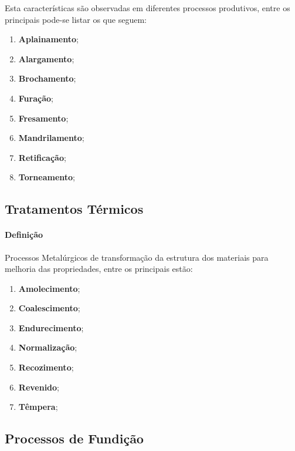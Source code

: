 \documentclass{article}
\begin{document}
            Esta características são observadas em diferentes processos produtivos, entre os principais pode-se listar os que seguem:
                \begin{enumerate}[rightmargin = \leftmargin, noitemsep]
                    \item \textbf{Aplainamento}; 
                    \item \textbf{Alargamento}; 
                    \item \textbf{Brochamento}; 
                    \item \textbf{Furação}; 
                    \item \textbf{Fresamento}; 
                    \item \textbf{Mandrilamento}; 
                    \item \textbf{Retificação}; 
                    \item \textbf{Torneamento}; 
                \end{enumerate}

        \subsection{Tratamentos Térmicos}
            \paragraph{Definição}Processos Metalúrgicos de transformação da estrutura dos materiais para melhoria das propriedades, entre os principais estão:
                \begin{enumerate}[rightmargin = \leftmargin, noitemsep]
                    \item \textbf{Amolecimento};
                    \item \textbf{Coalescimento};
                    \item \textbf{Endurecimento};
                    \item \textbf{Normalização};
                    \item \textbf{Recozimento};
                    \item \textbf{Revenido};
                    \item \textbf{Têmpera};
                \end{enumerate}
            
        \subsection{Processos de Fundição}
\end{document}
